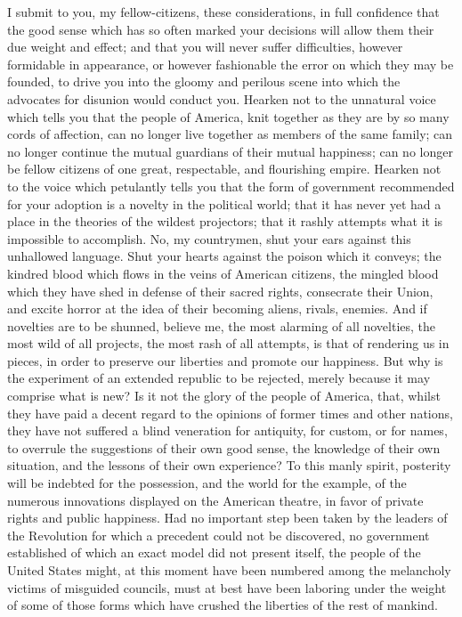 I submit to you, my fellow-citizens, these considerations, in full confidence that the good sense which has so often marked your decisions will allow them their due weight and effect; and that you will never suffer difficulties, however formidable in appearance, or however fashionable the error on which they may be founded, to drive you into the gloomy and perilous scene into which the advocates for disunion would conduct you. 
Hearken not to the unnatural voice which tells you that the people of America, knit together as they are by so many cords of affection, can no longer live together as members of the same family; can no longer continue the mutual guardians of their mutual happiness; can no longer be fellow citizens of one great, respectable, and flourishing empire. 
Hearken not to the voice which petulantly tells you that the form of government recommended for your adoption is a novelty in the political world; that it has never yet had a place in the theories of the wildest projectors; that it rashly attempts what it is impossible to accomplish. 
No, my countrymen, shut your ears against this unhallowed language. 
Shut your hearts against the poison which it conveys; the kindred blood which flows in the veins of American citizens, the mingled blood which they have shed in defense of their sacred rights, consecrate their Union, and excite horror at the idea of their becoming aliens, rivals, enemies. 
And if novelties are to be shunned, believe me, the most alarming of all novelties, the most wild of all projects, the most rash of all attempts, is that of rendering us in pieces, in order to preserve our liberties and promote our happiness. 
But why is the experiment of an extended republic to be rejected, merely because it may comprise what is new? 
Is it not the glory of the people of America, that, whilst they have paid a decent regard to the opinions of former times and other nations, they have not suffered a blind veneration for antiquity, for custom, or for names, to overrule the suggestions of their own good sense, the knowledge of their own situation, and the lessons of their own experience? 
To this manly spirit, posterity will be indebted for the possession, and the world for the example, of the numerous innovations displayed on the American theatre, in favor of private rights and public happiness. 
Had no important step been taken by the leaders of the Revolution for which a precedent could not be discovered, no government established of which an exact model did not present itself, the people of the United States might, at this moment have been numbered among the melancholy victims of misguided councils, must at best have been laboring under the weight of some of those forms which have crushed the liberties of the rest of mankind. 
